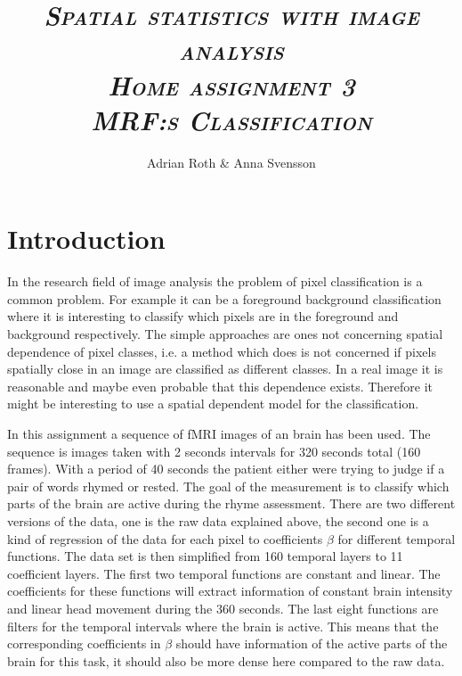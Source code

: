 \documentclass[a4paper,english]{article}
\begin{document}
\afterpage{\cfoot{\thepage}}

\title{\textit{{\textbf{\textsc{Spatial statistics with image analysis  \\ Home assignment 3 \\  MRF:s Classification}}}}}

\author{Adrian Roth \& Anna Svensson}

\maketitle
\thispagestyle{empty}



\pagebreak{}

\thispagestyle{empty}

\pagebreak{}

\section{Introduction}
In the research field of image analysis the problem of pixel classification is a common problem.
For example it can be a foreground background classification where it is interesting to classify which pixels are in the foreground and background respectively.
The simple approaches are ones not concerning spatial dependence of pixel classes, i.e. a method which does is not concerned if pixels spatially close in an image are classified as different classes.
In a real image it is reasonable and maybe even probable that this dependence exists.
Therefore it might be interesting to use a spatial dependent model for the classification.

In this assignment a sequence of fMRI images of an brain has been used.
The sequence is images taken with 2 seconds intervals for 320 seconds total (160 frames).
With a period of 40 seconds the patient either were trying to judge if a pair of words rhymed or rested.
The goal of the measurement is to classify which parts of the brain are active during the rhyme assessment.
There are two different versions of the data, one is the raw data explained above, the second one is a kind of regression of the data for each pixel to coefficients $\beta$ for different temporal functions.
The data set is then simplified from 160 temporal layers to 11 coefficient layers.
The first two temporal functions are constant and linear.
The coefficients for these functions will extract information of constant brain intensity and linear head movement during the 360 seconds.
The last eight functions are filters for the temporal intervals where the brain is active.
This means that the corresponding coefficients in $\beta$ should have information of the active parts of the brain for this task, it should also be more dense here compared to the raw data.
\end{document}
